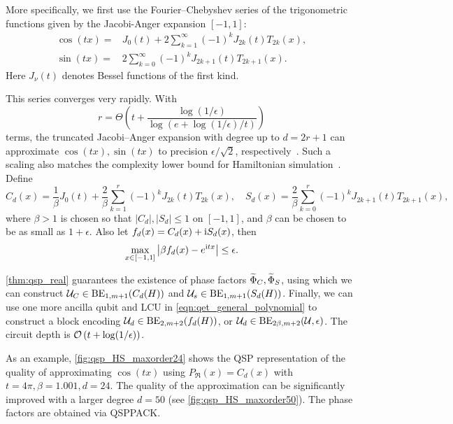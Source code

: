 More specifically, we first use the Fourier--Chebyshev series of the trigonometric functions given by the Jacobi-Anger expansion $[-1,1]$:
\begin{equation}
\begin{split}
\cos (t x)=&J_{0}(t)+2 \sum_{k=1}^{\infty}(-1)^{k} J_{2 k}(t) T_{2 k}(x),\\
\sin (t x)=&2 \sum_{k=0}^{\infty}(-1)^{k} J_{2 k+1}(t) T_{2 k+1}(x).
\end{split}
\label{eqn:jacobi_anger}
\end{equation}
Here $J_{\nu}(t)$ denotes Bessel functions of the first kind.

This series converges very rapidly. With
\begin{equation}
r=\Theta\left(t+\frac{\log (1 / \epsilon)}{\log (e+\log (1 / \epsilon) / t)}\right)
\end{equation}
terms, the truncated Jacobi--Anger expansion with degree up to $d=2r+1$ can approximate $\cos (t x),\sin(tx)$ to precision $\epsilon/\sqrt{2}$, respectively~\cite[Corollary 32]{GilyenSuLowEtAl2019}.
Such a scaling also matches the complexity lower bound for Hamiltonian simulation~\cite{BerryAhokasCleveEtAl2007,LowChuang2017}.
Define
\begin{equation}\label{eqn:jacobi_anger_scale}
C_d(x)=\frac{1}{\beta}J_0(t)+\frac{2}{\beta} \sum_{k=1}^{r}(-1)^{k} J_{2 k}(t) T_{2 k}(x), \quad S_d(x)=\frac{2}{\beta} \sum_{k=0}^{r}(-1)^{k} J_{2 k+1}(t) T_{2 k+1}(x),
\end{equation} 
where $\beta>1$ is chosen so that $|C_d|,|S_d|\le 1$ on $[-1,1]$, and $\beta$ can be chosen to be as small as $1+\epsilon$. Also let $f_d(x)=C_d(x)+\mathrm{i} S_d(x)$, then 
\begin{equation}
\max_{x\in[-1,1]}\left\lvert\beta f_d(x)-e^{\mathrm{i} tx}\right\rvert\le \epsilon.
\end{equation}

\cref{thm:qsp_real} guarantees the existence of phase factors $\widetilde{\Phi}_C,\widetilde{\Phi}_S$, using which we can construct $\mathcal{U}_C\in\operatorname{BE}_{1,m+1}(C_d(H))$ and $\mathcal{U}_s\in\operatorname{BE}_{1,m+1}(S_d(H))$.
Finally, we can use one more ancilla qubit and LCU in \cref{eqn:qet_general_polynomial} to construct a block encoding $\mathcal{U}_d\in\operatorname{BE}_{2,m+2}(f_d(H))$, or  $\mathcal{U}_d\in\operatorname{BE}_{2\beta,m+2}(\mathcal{U},\epsilon)$.
The circuit depth is $\mathcal{O}\left(t + \log(1/\epsilon)\right)$.

As an example, \cref{fig:qsp_HS_maxorder24} shows the QSP representation of the quality of approximating $\cos(tx)$ using $P_{\Re}(x)=C_d(x)$ with $t=4\pi,\beta=1.001,d=24$. The quality of the approximation can be significantly improved with a larger degree $d=50$ (see \cref{fig:qsp_HS_maxorder50}).
The phase factors are obtained via QSPPACK.


